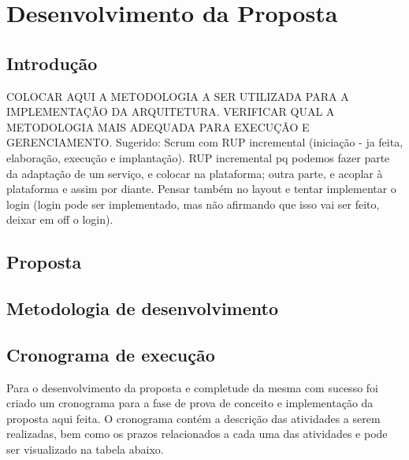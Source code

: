 

\chapter[Desenvolvimento da Proposta]{Desenvolvimento da Proposta}

\section{Introdução}

COLOCAR AQUI A METODOLOGIA A SER UTILIZADA PARA A IMPLEMENTAÇÃO DA ARQUITETURA. VERIFICAR QUAL A METODOLOGIA MAIS ADEQUADA PARA EXECUÇÃO E GERENCIAMENTO. 
Sugerido: Scrum com RUP incremental (iniciação - ja feita, elaboração, execução e implantação).
RUP incremental pq podemos fazer parte da adaptação de um serviço, e colocar na plataforma; outra parte, e acoplar à plataforma e assim por diante. Pensar também no layout e tentar implementar o login (login pode ser implementado, mas não afirmando que isso vai ser feito, deixar em off o login).

\section{Proposta}



\section{Metodologia de desenvolvimento}

\section{Cronograma de execução}
Para o desenvolvimento da proposta e completude da mesma com sucesso foi criado um cronograma para a fase de prova de conceito e implementação da proposta aqui feita. O cronograma contém a descrição das atividades a serem realizadas, bem como os prazos relacionados a cada uma das atividades e pode ser visualizado na tabela abaixo.

